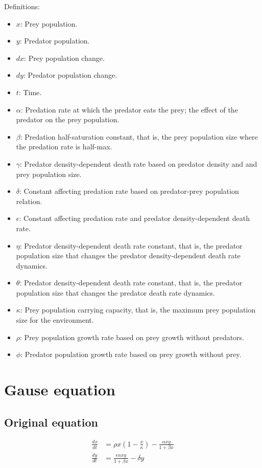 Definitions:
\begin{itemize}
\item $x$: Prey population.
\item $y$: Predator population.
\item $dx$: Prey population change.
\item $dy$: Predator population change.
\item $t$: Time.
\item $\alpha$: Predation rate at which the predator eats the prey; the effect of the predator on the prey population.
\item $\beta$: Predation half-saturation constant, that is, the prey population size where the predation rate is half-max.
\item $\gamma$: Predator density-dependent death rate based on predator density and and prey population size.
\item $\delta$: Constant affecting predation rate based on predator-prey population relation.
\item $\epsilon$: Constant affecting predation rate and predator density-dependent death rate.
\item $\eta$: Predator density-dependent death rate constant, that is, the predator population size that changes the predator density-dependent death rate dynamics.
\item $\theta$: Predator density-dependent death rate constant, that is, the predator population size that changes the predator death rate dynamics.
\item $\kappa$: Prey population carrying capacity, that is, the maximum prey population size for the environment.
\item $\rho$: Prey population growth rate based on prey growth without predators.
\item $\phi$: Predator population growth rate based on prey growth without prey.
\end{itemize}

\section{Gause equation}
\subsection{Original equation}
\begin{align*}
\frac{dx}{dt} &= \rho x \left(1 - \frac{x}{\kappa}\right) - \frac{\alpha xy}{1 + \beta x} \\
\frac{dy}{dt} &= \frac{\epsilon \alpha xy}{1 + \beta x} - \delta y
\end{align*}

